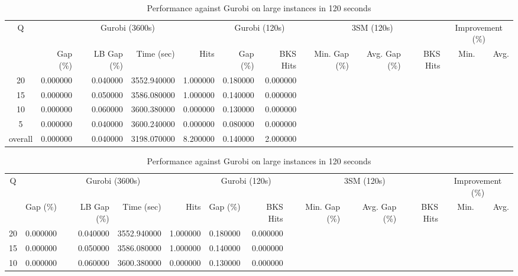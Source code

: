 \begin{table}[H]
\caption{Performance against Gurobi on large instances in 120 seconds}
\label{tab:3lm_resuts200T120}
\begin{tabular}{c rrrr rr rrr rr}
\toprule
Q & \multicolumn{4}{c}{Gurobi (3600s)} & \multicolumn{2}{c}{Gurobi (120s)} & \multicolumn{3}{c}{3SM (120s)} & \multicolumn{2}{c}{Improvement (\%)} \\
 & Gap (\%) & LB Gap (\%) & Time (sec) & Hits & Gap (\%) & BKS Hits & Min. Gap (\%) & Avg. Gap (\%) & BKS Hits & Min. & Avg. \\
\midrule
\cmidrule(lr){1-1} \cmidrule(lr){2-5} \cmidrule(lr){2-5} \cmidrule(lr){6-7} \cmidrule(lr){8-10} \cmidrule(lr){11-12}
20 & 0.000000 & 0.040000 & 3552.940000 & 1.000000 & 0.180000 & 0.000000 &  &  &  &  &  \\
15 & 0.000000 & 0.050000 & 3586.080000 & 1.000000 & 0.140000 & 0.000000 &  &  &  &  &  \\
10 & 0.000000 & 0.060000 & 3600.380000 & 0.000000 & 0.130000 & 0.000000 &  &  &  &  &  \\
5 & 0.000000 & 0.040000 & 3600.240000 & 0.000000 & 0.080000 & 0.000000 &  &  &  &  &  \\
\midrule
overall & 0.000000 & 0.040000 & 3198.070000 & 8.200000 & 0.140000 & 2.000000 &  &  &  &  &  \\
\bottomrule
\end{tabular}
\end{table}\begin{table}[H]
\caption{Performance against Gurobi on large instances in 120 seconds}
\label{tab:3lm_resuts200T120}
\begin{tabular}{c rrrr rr rrr rr}
\toprule
Q & \multicolumn{4}{c}{Gurobi (3600s)} & \multicolumn{2}{c}{Gurobi (120s)} & \multicolumn{3}{c}{3SM (120s)} & \multicolumn{2}{c}{Improvement (\%)} \\
 & Gap (\%) & LB Gap (\%) & Time (sec) & Hits & Gap (\%) & BKS Hits & Min. Gap (\%) & Avg. Gap (\%) & BKS Hits & Min. & Avg. \\
\midrule
\cmidrule(lr){1-1} \cmidrule(lr){2-5} \cmidrule(lr){2-5} \cmidrule(lr){6-7} \cmidrule(lr){8-10} \cmidrule(lr){11-12}
20 & 0.000000 & 0.040000 & 3552.940000 & 1.000000 & 0.180000 & 0.000000 &  &  &  &  &  \\
15 & 0.000000 & 0.050000 & 3586.080000 & 1.000000 & 0.140000 & 0.000000 &  &  &  &  &  \\
10 & 0.000000 & 0.060000 & 3600.380000 & 0.000000 & 0.130000 & 0.000000 &  &  &  &  &  \\

\end{tabular}
\end{table}
